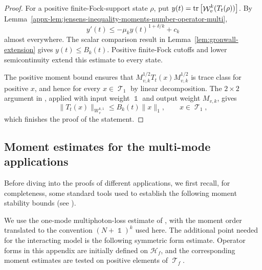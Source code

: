 \documentclass[11pt]{article}
\theoremstyle{myplain}
\theoremstyle{mydefinition}
\theoremstyle{remark}
\DeclareMathOperator{\cT}{\mathcal{T}}
\DeclareMathOperator{\cW}{\mathcal{W}}
\DeclareMathOperator{\1}{\mathds{1}}
\newcommand{\tr}[1][]{\operatorname{tr}%
  \ifx#1\empty \else \left[ #1 \right] \fi}
\begin{document}
        \begin{proof}
            For a positive finite-Fock-support state $\rho$, put $y(t)=\tr[\cW_v^k(T_t(\rho))]$. By Lemma~\ref{appx-lem:jensens-inequality-moments-number-operator-multi},
            \begin{equation*}
                y'(t)
                \leq-\mu_k y(t)^{1+\delta/k}+c_k
            \end{equation*}
            almost everywhere. The scalar comparison result in Lemma~\ref{lem:gronwall-extension} gives $y(t)\leq B_k(t)$. Positive finite-Fock cutoffs and lower semicontinuity extend this estimate to every state.

            
            The positive moment bound ensures that $M_{v,k}^{1/2}T_t(x)M_{v,k}^{1/2}$ is trace class for positive $x$, and hence for every $x \in \cT_1$ by linear decomposition. The $2\times2$ argument in \cite[proof of Thm.~4.1.1]{Moebus.2025thesis}, applied with input weight $\1$ and output weight $M_{v,k}$, gives
            \begin{equation*}
                \|T_t(x)\|_{W_v^{k,1}} \le B_k(t)\|x\|_1,
                \qquad x \in \cT_1,
            \end{equation*}
            which finishes the proof of the statement.
            
        \end{proof}


    
    \subsection{Moment estimates for the multi-mode applications}\label{appx:technical-bounds-application}
    
        Before diving into the proofs of different applications, we first recall, for completeness, some standard tools used to establish the following moment stability bounds (see \cite{Gondolf.2024, Moebus.2024Learning, Moebus.2025thesis}).

        
        We use the one-mode multiphoton-loss estimate of \cite[Lem.~4.3]{Gondolf.2024}, with the moment order translated to the convention $(N+\1)^k$ used here. The additional point needed for the interacting model is the following symmetric form estimate. Operator forms in this appendix are initially defined on $\mathcal H_f$, and the corresponding moment estimates are tested on positive elements of $\cT_f$.
\end{document}

